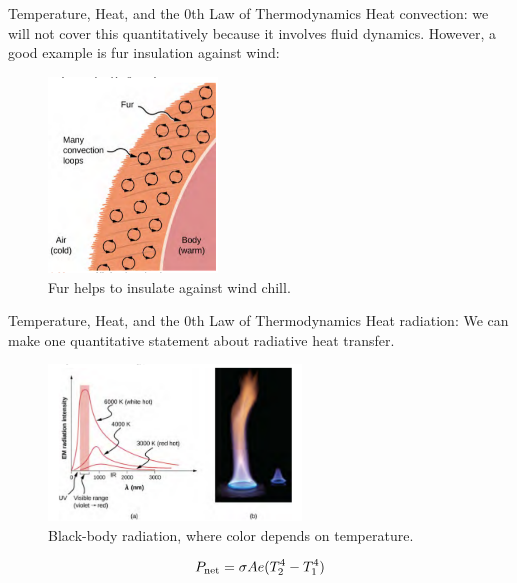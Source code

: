 \documentclass{beamer}
\begin{document}
\begin{frame}{Temperature, Heat, and the 0th Law of Thermodynamics}
Heat convection: we will not cover this quantitatively because it involves fluid dynamics. However, a good example is fur insulation against wind:
\begin{figure}
\centering
\includegraphics[width=0.4\textwidth,trim=0cm 0.1cm 0cm 0.1cm,clip=true]{figures/heat2.png}
\caption{\label{fig:heat2} Fur helps to insulate against wind chill.}
\end{figure}
\end{frame}

\begin{frame}{Temperature, Heat, and the 0th Law of Thermodynamics}
\small
Heat radiation: We can make one quantitative statement about radiative heat transfer.
\begin{figure}
\centering
\includegraphics[width=0.6\textwidth]{figures/heat3.png}
\caption{\label{fig:heat3} Black-body radiation, where color depends on temperature.}
\end{figure}
\begin{equation}
P_{\rm net} = \sigma A e (T_{\rm 2}^4 - T_{\rm 1}^4)
\end{equation}
\end{frame}
\end{document}

